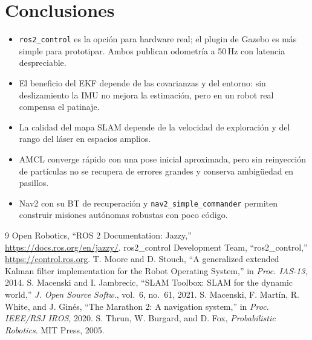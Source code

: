 \documentclass[conference,a4paper]{IEEEtran}
\begin{document}
\section{Conclusiones}
\begin{itemize}
  \item \texttt{ros2\_control} es la opción para hardware real; el plugin de Gazebo es más simple para prototipar. Ambos publican odometría a 50\,Hz con latencia despreciable.
  \item El beneficio del EKF depende de las covarianzas y del entorno: sin deslizamiento la IMU no mejora la estimación, pero en un robot real compensa el patinaje.
  \item La calidad del mapa SLAM depende de la velocidad de exploración y del rango del láser en espacios amplios.
  \item AMCL converge rápido con una pose inicial aproximada, pero sin reinyección de partículas no se recupera de errores grandes y conserva ambigüedad en pasillos.
  \item Nav2 con su BT de recuperación y \texttt{nav2\_simple\_commander} permiten construir misiones autónomas robustas con poco código.
\end{itemize}

\begin{thebibliography}{9}
 Open Robotics, ``ROS 2 Documentation: Jazzy,'' \url{https://docs.ros.org/en/jazzy/}.
 ros2\_control Development Team, ``ros2\_control,'' \url{https://control.ros.org}.
 T. Moore and D. Stouch, ``A generalized extended Kalman filter implementation for the Robot Operating System,'' in \emph{Proc. IAS-13}, 2014.
 S. Macenski and I. Jambrecic, ``SLAM Toolbox: SLAM for the dynamic world,'' \emph{J. Open Source Softw.}, vol.~6, no.~61, 2021.
 S. Macenski, F. Martín, R. White, and J. Ginés, ``The Marathon 2: A navigation system,'' in \emph{Proc. IEEE/RSJ IROS}, 2020.
 S. Thrun, W. Burgard, and D. Fox, \emph{Probabilistic Robotics}. MIT Press, 2005.
\end{thebibliography}
\end{document}
